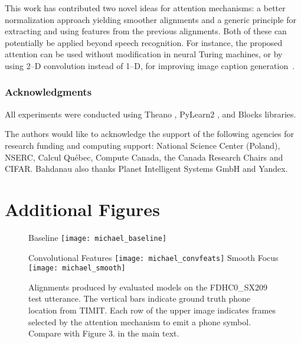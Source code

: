 \documentclass{article}
\begin{document}
This work has contributed two novel ideas for attention mechanisms: a better
normalization approach yielding smoother alignments and a generic principle for
extracting and using features from the previous alignments. 
Both of these can potentially be applied beyond speech recognition. For
instance, the proposed attention can be used without
modification in neural Turing machines, or by using 2--D
convolution instead of 1--D, for improving image caption
generation~\cite{xu_show_2015}.


\subsubsection*{Acknowledgments}
All experiments were conducted using Theano
\cite{bergstra+al:2010-scipy,Bastien-Theano-2012}, PyLearn2
\cite{pylearn2_arxiv_2013}, and Blocks
\cite{vanmerrienboer_blocks_2015} libraries.

The authors would like to acknowledge the support of the following agencies for
research funding and computing support: National Science Center (Poland), 
NSERC, Calcul Qu\'{e}bec, Compute Canada,
the Canada Research Chairs and CIFAR. Bahdanau also thanks Planet
Intelligent Systems GmbH and Yandex.


{\small


}

\clearpage
\appendix 
\section{Additional Figures}

\begin{figure}[h]
  \centering
  Baseline
  \texttt{[image: michael\_baseline]}

  Convolutional Features
  \texttt{[image: michael\_convfeats]}
  Smooth Focus
  \texttt{[image: michael\_smooth]}
\caption{Alignments
      produced by evaluated models on the FDHC0\_SX209 test utterance. The vertical bars
      indicate ground truth phone location from TIMIT. Each
      row of the upper image indicates frames selected by
      the attention mechanism to emit a phone symbol. Compare with
      Figure 3. in the main text.
  }  

  \vspace{-4mm}
\end{figure}
\end{document}
